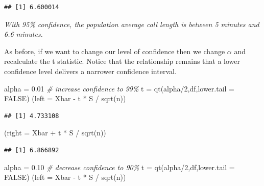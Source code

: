 \documentclass[
]{book}
\newenvironment{Shaded}{\begin{snugshade}}{\end{snugshade}}
\newcommand{\AttributeTok}[1]{\textcolor[rgb]{0.77,0.63,0.00}{#1}}
\newcommand{\CommentTok}[1]{\textcolor[rgb]{0.56,0.35,0.01}{\textit{#1}}}
\newcommand{\ConstantTok}[1]{\textcolor[rgb]{0.00,0.00,0.00}{#1}}
\newcommand{\DecValTok}[1]{\textcolor[rgb]{0.00,0.00,0.81}{#1}}
\newcommand{\FloatTok}[1]{\textcolor[rgb]{0.00,0.00,0.81}{#1}}
\newcommand{\FunctionTok}[1]{\textcolor[rgb]{0.00,0.00,0.00}{#1}}
\newcommand{\NormalTok}[1]{#1}
\newcommand{\OtherTok}[1]{\textcolor[rgb]{0.56,0.35,0.01}{#1}}
\newcommand{\SpecialCharTok}[1]{\textcolor[rgb]{0.00,0.00,0.00}{#1}}
\begin{document}
\begin{verbatim}
## [1] 6.600014
\end{verbatim}

\emph{With 95\% confidence, the population average call length is between 5 minutes and 6.6 minutes.}

As before, if we want to change our level of confidence then we change \(\alpha\) and recalculate the t statistic. Notice that the relationship remains that a lower confidence level delivers a narrower confidence interval.

\begin{Shaded}
\begin{Highlighting}[]
\NormalTok{alpha }\OtherTok{=} \FloatTok{0.01} \CommentTok{\# increase confidence to 99\%}
\NormalTok{t }\OtherTok{=} \FunctionTok{qt}\NormalTok{(alpha}\SpecialCharTok{/}\DecValTok{2}\NormalTok{,df,}\AttributeTok{lower.tail =} \ConstantTok{FALSE}\NormalTok{)}
\NormalTok{(}\AttributeTok{left =}\NormalTok{ Xbar }\SpecialCharTok{{-}}\NormalTok{ t }\SpecialCharTok{*}\NormalTok{ S }\SpecialCharTok{/} \FunctionTok{sqrt}\NormalTok{(n))}
\end{Highlighting}
\end{Shaded}

\begin{verbatim}
## [1] 4.733108
\end{verbatim}

\begin{Shaded}
\begin{Highlighting}[]
\NormalTok{(}\AttributeTok{right =}\NormalTok{ Xbar }\SpecialCharTok{+}\NormalTok{ t }\SpecialCharTok{*}\NormalTok{ S }\SpecialCharTok{/} \FunctionTok{sqrt}\NormalTok{(n))}
\end{Highlighting}
\end{Shaded}

\begin{verbatim}
## [1] 6.866892
\end{verbatim}

\begin{Shaded}
\begin{Highlighting}[]
\NormalTok{alpha }\OtherTok{=} \FloatTok{0.10} \CommentTok{\# decrease confidence to 90\%}
\NormalTok{t }\OtherTok{=} \FunctionTok{qt}\NormalTok{(alpha}\SpecialCharTok{/}\DecValTok{2}\NormalTok{,df,}\AttributeTok{lower.tail =} \ConstantTok{FALSE}\NormalTok{)}
\NormalTok{(}\AttributeTok{left =}\NormalTok{ Xbar }\SpecialCharTok{{-}}\NormalTok{ t }\SpecialCharTok{*}\NormalTok{ S }\SpecialCharTok{/} \FunctionTok{sqrt}\NormalTok{(n))}
\end{Highlighting}
\end{Shaded}
\end{document}
